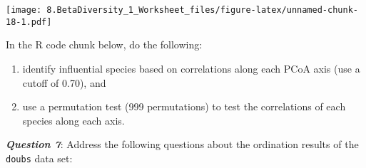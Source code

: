 \documentclass[
]{article}
\newenvironment{Shaded}{\begin{snugshade}}{\end{snugshade}}
\newcommand{\AttributeTok}[1]{\textcolor[rgb]{0.77,0.63,0.00}{#1}}
\newcommand{\DecValTok}[1]{\textcolor[rgb]{0.00,0.00,0.81}{#1}}
\newcommand{\FloatTok}[1]{\textcolor[rgb]{0.00,0.00,0.81}{#1}}
\newcommand{\FunctionTok}[1]{\textcolor[rgb]{0.00,0.00,0.00}{#1}}
\newcommand{\NormalTok}[1]{#1}
\newcommand{\OtherTok}[1]{\textcolor[rgb]{0.56,0.35,0.01}{#1}}
\newcommand{\SpecialCharTok}[1]{\textcolor[rgb]{0.00,0.00,0.00}{#1}}
\newcommand{\StringTok}[1]{\textcolor[rgb]{0.31,0.60,0.02}{#1}}
\providecommand{\tightlist}{%
  \setlength{\itemsep}{0pt}\setlength{\parskip}{0pt}}
\begin{document}
\begin{Shaded}
\end{Shaded}

\texttt{[image: 8.BetaDiversity\_1\_Worksheet\_files/figure-latex/unnamed-chunk-18-1.pdf]}

In the R code chunk below, do the following:

\begin{enumerate}
\def\labelenumi{\arabic{enumi}.}
\tightlist
\item
  identify influential species based on correlations along each PCoA
  axis (use a cutoff of 0.70), and
\item
  use a permutation test (999 permutations) to test the correlations of
  each species along each axis.
\end{enumerate}

\begin{Shaded}
\end{Shaded}

\textbf{\emph{Question 7}}: Address the following questions about the
ordination results of the \texttt{doubs} data set:
\end{document}
